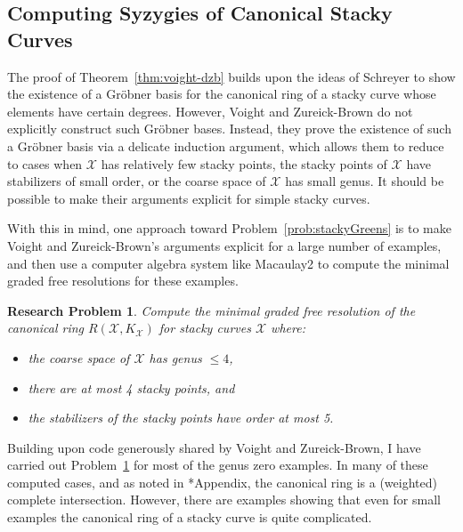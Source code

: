 \documentclass[11pt,reqno]{amsart}
\newtheorem{problem}[lemma]{Research Problem}
\theoremstyle{remark}
\newcommand{\cX}{\mathcal{X}}
\begin{document}
\subsection{Computing Syzygies of Canonical Stacky Curves}

The proof of Theorem~\ref{thm:voight-dzb} builds upon the ideas of Schreyer \cite{schreyer91} to show the existence of a Gr\"{o}bner basis for the canonical ring of a stacky curve whose elements have certain degrees. However, Voight and Zureick-Brown do not explicitly construct such Gr\"{o}bner bases. Instead, they prove the existence of such a Gr\"{o}bner basis via a delicate induction argument, which allows them to reduce to cases when $\cX$ has relatively few stacky points, the stacky points of $\cX$ have stabilizers of small order, or the coarse space of $\cX$ has small genus. It should be possible to make their arguments explicit for simple stacky curves. 

With this in mind, one approach toward Problem~\ref{prob:stackyGreens} is to make Voight and Zureick-Brown's arguments explicit for a large number of examples, and then use a computer algebra system like Macaulay2 to compute the minimal graded free resolutions for these examples.  

\begin{problem}\label{prob:comp-canonical-stacky}
	Compute the minimal graded free resolution of the canonical ring $R(\cX, K_{\cX})$ for stacky curves $\cX$ where:
	\begin{itemize}
		\item the coarse space of $\cX$ has genus $\leq 4$,
		\item there are at most 4 stacky points, and
		\item the stabilizers of the stacky points have order at most 5.
	\end{itemize}
\end{problem}

Building upon code generously shared by Voight and Zureick-Brown, I have carried out Problem~\ref{prob:comp-canonical-stacky} for most of the genus zero examples. In many of these computed cases, and as noted in \cite{voightZurieckBrown22}*{Appendix}, the canonical ring is a (weighted) complete intersection. However, there are examples showing that even for small examples the canonical ring of a stacky curve is quite complicated.
\end{document}
